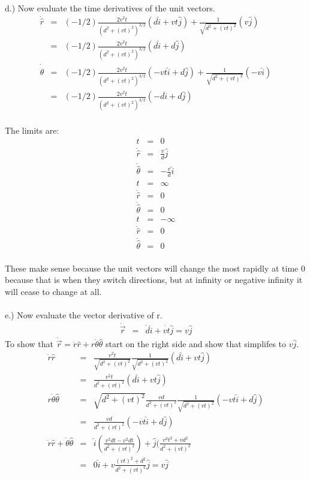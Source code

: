 \documentclass[11pt]{amsart}
\begin{document}
d.) Now evaluate the time derivatives of the unit vectors. \\
\begin{eqnarray*}
\dot{\hat{r}} &=& (-1/2)\frac{2v^{2}t}{(d^{2}+(vt)^{2})^{3/2}}(d\hat{i}+vt\hat{j}) + \frac{1}{\sqrt{d^{2}+(vt)^{2}}}(v\hat{j}) \\
&=& (-1/2)\frac{2v^{2}t}{(d^{2}+(vt)^{2})^{3/2}}(d\hat{i}+d\hat{j}) \\
\dot{\hat{\theta}} &=& (-1/2)\frac{2v^{2}t}{(d^{2}+(vt)^{2})^{3/2}}(-vt\hat{i}+d\hat{j}) + \frac{1}{\sqrt{d^{2}+(vt)^{2}}}(-v\hat{i}) \\
&=& (-1/2)\frac{2v^{2}t}{(d^{2}+(vt)^{2})^{3/2}}(-d\hat{i}+d\hat{j}) 
\end{eqnarray*} \\
The limits are: \\
\begin{eqnarray*} 
t &=& 0 \\
\dot{\hat{r}} &=& \frac{v}{d}\hat{j} \\
\dot{\hat{\theta}} &=& -\frac{v}{d}\hat{i} \\
t &=& \infty \\
\dot{\hat{r}} &=& 0 \\
\dot{\hat{\theta}} &=& 0 \\
t &=& -\infty \\
\dot{\hat{r}} &=& 0 \\
\dot{\hat{\theta}} &=& 0 
\end{eqnarray*} \\
These make sense because the unit vectors will change the most rapidly at time 0 because that is when they switch directions, but at infinity or negative infinity it will cease to change at all. \\ \\
e.) Now evaluate the vector derivative of r. \\
\begin{eqnarray*}
\dot{\vec{r}} &=& \dot{d}\hat{i}+\dot{vt}\hat{j} = v\hat{j} 
\end{eqnarray*}
To show that $\dot{\vec{r}} = \dot{r}\hat{r}+r\dot{\theta}\hat{\theta}$ start on the right side and show that simplifes to $v\hat{j}$. \\ 
\begin{eqnarray*} 
\dot{r}\hat{r} &=&  \frac{v^{2}t}{\sqrt{d^{2}+(vt)^{2}}}\frac{1}{\sqrt{d^{2}+(vt)^{2}}}(d\hat{i}+vt\hat{j}) \\
&=&\frac{v^{2}t}{d^{2}+(vt)^{2}}(d\hat{i}+vt\hat{j}) \\
r\dot{\theta}\hat{\theta} &=& \sqrt{d^{2}+(vt)^{2}}\frac{vd}{d^{2}+(vt)^{2}}\frac{1}{\sqrt{d^{2}+(vt)^{2}}}(-vt\hat{i}+d\hat{j}) \\
&=& \frac{vd}{d^{2}+(vt)^{2}}(-vt\hat{i}+d\hat{j}) \\
\dot{r}\hat{r}+\dot{\theta}\hat{\theta} &=& \hat{i}(\frac{v^{2}dt-v^{2}dt}{d^{2}+(vt)^{2}}) + \hat{j}(\frac{v^{3}t^{2}+vd^{2}}{d^{2}+(vt)^{2}} \\
&=& 0\hat{i} +v\frac{(vt)^{2}+d^{2}}{d^{2}+(vt)^{2}}\hat{j} = v\hat{j} 
\end{eqnarray*}
\end{document}
